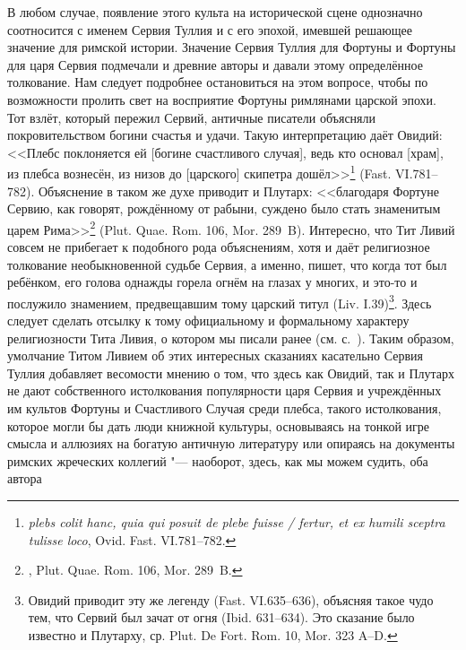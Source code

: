 

В любом случае, появление этого культа на исторической сцене однозначно соотносится с именем Сервия Туллия и с его эпохой, имевшей решающее значение для римской истории. Значение Сервия Туллия для Фортуны и Фортуны для царя Сервия подмечали и древние авторы и давали этому определённое толкование. Нам следует подробнее остановиться на этом вопросе, чтобы по возможности пролить свет на восприятие Фортуны римлянами царской эпохи. Тот взлёт, который пережил Сервий, античные писатели объясняли покровительством богини счастья и удачи. Такую интерпретацию даёт Овидий: <<Плебс поклоняется ей [богине счастливого случая], ведь кто основал [храм], из плебса вознесён, из низов до [царского] скипетра дошёл>>\footnote{\textit{plebs colit hanc, quia qui posuit de plebe fuisse / fertur, et ex humili sceptra tulisse loco}, Ovid. Fast. VI.781--782.} (Fast. VI.781--782). Объяснение в таком же духе приводит и Плутарх: <<благодаря Фортуне Сервию, как говорят, рождённому от рабыни, суждено было стать знаменитым царем Рима>>\footnote{, Plut. Quae. Rom. 106, Mor. 289~B.} (Plut. Quae. Rom. 106, Mor. 289~B). Интересно, что Тит Ливий совсем не прибегает к подобного рода объяснениям, хотя и даёт религиозное толкование необыкновенной судьбе Сервия, а именно, пишет, что когда тот был ребёнком, его голова однажды горела огнём на глазах у многих, и это-то и послужило знамением, предвещавшим тому царский титул (Liv. I.39)\footnote{Овидий приводит эту же легенду (Fast. VI.635--636), объясняя такое чудо тем, что Сервий был зачат от огня (Ibid. 631--634). Это сказание было известно и Плутарху, ср. Plut. De Fort. Rom. 10, Mor. 323 A--D.}. Здесь следует сделать отсылку к тому официальному и формальному характеру религиозности Тита Ливия, о котором мы писали ранее (см. с.~\pageref{LiviusAndReligio}). Таким образом, умолчание Титом Ливием об этих интересных сказаниях касательно Сервия Туллия добавляет весомости мнению о том, что здесь как Овидий, так и Плутарх не дают собственного истолкования популярности царя Сервия и учреждённых им культов Фортуны и Счастливого Случая среди плебса, такого истолкования, которое могли бы дать люди книжной культуры, основываясь на тонкой игре смысла и аллюзиях на богатую античную литературу или опираясь на документы римских жреческих коллегий "--- наоборот, здесь, как мы можем судить, оба автора 